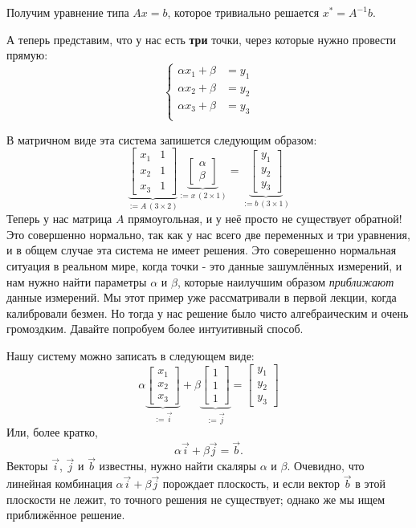 \documentclass[notitlepage]{report}
\begin{document}
Получим уравнение типа $Ax = b$, которое тривиально решается $x^* = A^{-1}b$.

А теперь представим, что у нас есть \textbf{три} точки, через которые нужно провести прямую:
$$
\left\{
\begin{split}
\alpha x_1 + \beta &= y_1\\
\alpha x_2 + \beta &= y_2\\
\alpha x_3 + \beta &= y_3\\
\end{split}
\right.
$$

В матричном виде эта система запишется следующим образом:
$$
\underbrace{\begin{bmatrix}x_1  & 1 \\ x_2 & 1 \\x_3 & 1 \end{bmatrix} }_{:= A\,(3\times 2)}
\underbrace{\begin{bmatrix} \alpha \\ \beta \end{bmatrix}}_{:=x\,(2\times 1)} = \underbrace{\begin{bmatrix} y_1 \\ y_2 \\ y_3 \end{bmatrix}}_{:=b\, (3\times 1)}
$$
Теперь у нас матрица $A$ прямоугольная, и у неё просто не существует обратной! Это совершенно нормально, так как у нас всего две переменных и три уравнения, и в общем случае эта система не имеет решения.
Это соверешенно нормальная ситуация в реальном мире, когда точки - это данные зашумлённых измерений, и нам нужно найти параметры $\alpha$ и $\beta$, которые наилучшим образом \textit{приближают} данные измерений.
Мы этот пример уже рассматривали в первой лекции, когда калибровали безмен. Но тогда у нас решение было чисто алгебраическим и очень громоздким. Давайте попробуем более интуитивный способ.

Нашу систему можно записать в следующем виде:
$$
\alpha \underbrace{\begin{bmatrix}x_1  \\ x_2 \\x_3  \end{bmatrix} }_{:=\vec{i}}
+\beta \underbrace{\begin{bmatrix}1 \\ 1 \\1 \end{bmatrix} }_{:=\vec{j}} = 
\begin{bmatrix}y_1\\y_2\\y_3\end{bmatrix}
$$
Или, более кратко, 
$$
\alpha \vec{i} + \beta\vec{j} = \vec{b}.
$$
Векторы $\vec i$, $\vec j$ и $\vec b$ известны, нужно найти скаляры $\alpha$ и $\beta$.
Очевидно, что линейная комбинация $\alpha \vec{i} + \beta\vec{j}$ порождает плоскость, и если вектор $\vec b$ в этой плоскости не лежит, то точного решения не существует; однако же мы ищем приближённое решение.
\end{document}
